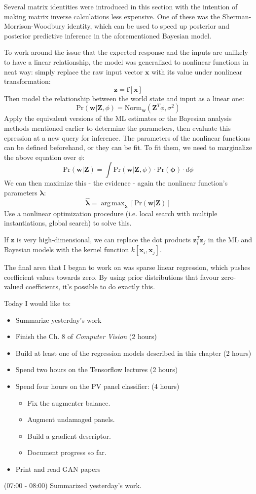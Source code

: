 \documentclass[idxtotoc,hyperref,openany]{labbook} %
\DeclareMathOperator*{\argmax}{arg\,max}
\begin{document}
Several matrix identities were introduced in this section with the intention of making matrix inverse calculations less expensive. One of these was the Sherman-Morrison-Woodbury identity, which can be used to speed up posterior and posterior predictive inference in the aforementioned Bayesian model.

To work around the issue that the expected response and the inputs are unlikely to have a linear relationship, the model was generalized to nonlinear functions in neat way: simply replace the raw input vector $\mathbf{x}$ with its value under nonlinear transformation:
\[
	\mathbf{z} = \mathbf{f}[\mathbf{x}]
\]
Then model the relationship between the world state and input as a linear one:
\[
	\text{Pr}(\mathbf{w}|\mathbf{Z}, \phi) = \text{Norm}_{\mathbf{w}}(\mathbf{Z}^T\phi, \sigma^2)
\]
Apply the equivalent versions of the ML estimates or the Bayesian analysis methods mentioned earlier to determine the parameters, then evaluate this epression at a new query for inference. The parameters of the nonlinear functions can be defined beforehand, or they can be fit. To fit them, we need to marginalize the above equation over $\phi$:
\[
	\text{Pr}(\mathbf{w}|\mathbf{Z}) = \int \text{Pr}(\mathbf{w}|\mathbf{Z}, \phi)\cdot\text{Pr}(\mathbf{\phi})\cdot d\phi
\]
We can then maximize this - the evidence - again the nonlinear function's parameters $\mathbf{\lambda}$:
\[
	\hat{\mathbf{\lambda}} = \argmax_{\mathbf{\lambda}} [\text{Pr}(\mathbf{w}|\mathbf{Z})]
\]
Use a nonlinear optimization procedure (i.e. local search with multiple instantiations, global search) to solve this.

If $\mathbf{z}$ is very high-dimensional, we can replace the dot products $\mathbf{z}_i^T\mathbf{z}_j$ in the ML and Bayesian models with the kernel function $k[\mathbf{x}_i, \mathbf{x}_j]$. 

The final area that I began to work on was sparse linear regression, which pushes coefficient values towards zero. By using prior distributions that favour zero-valued coefficients, it's possible to do exactly this.


 Today I would like to:
 \begin{itemize}
 	\item Summarize yesterday's work
 	\item Finish the Ch. 8 of \emph{Computer Vision} (2 hours)
 	\item Build at least one of the regression models described in this chapter (2 hours)
 	\item Spend two hours on the Tensorflow lectures (2 hours)
 	\item Spend four hours on the PV panel classifier: (4 hours)
 	\begin{itemize}
 		\item Fix the augmenter balance.
 		\item Augment undamaged panels.
 		\item Build a gradient descriptor.
 		\item Document progress so far.
 	\end{itemize}
 	\item Print and read GAN papers
 \end{itemize}
 
 (07:00 - 08:00) Summarized yesterday's work.
 
\end{document}
